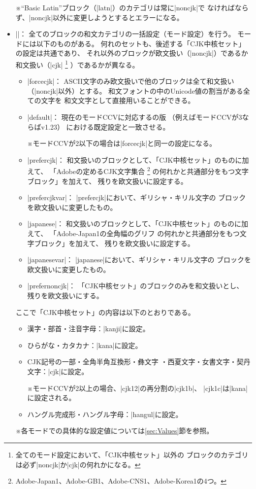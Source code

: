 \documentclass[uplatex,dvipdfmx,a4paper]{jsarticle}
\newcommand{\Meta}[1]{$\langle$\mbox{}#1\mbox{}$\rangle$}
\newcommand{\Note}{\par\noindent ※}
\newcommand{\Means}{：\quad}
\newcommand{\strong}{\textsf}
\begin{document}
\begin{itemize}
  \Note “Basic Latin”ブロック（|latn|）のカテゴリは常に|noncjk|で
    なければならず、|noncjk|以外に変更しようとするとエラーになる。

\item |\cjkcategorymode{|\Meta{モード}|}|\Means
  全てのブロックの和文カテゴリの一括設定（モード設定）を行う。
  モードには以下のものがある。
  何れのセットも、後述する「CJK中核セット」の設定は共通であり、
  それ以外のブロックが欧文扱い（|noncjk|）であるか
  和文扱い（|cjk|%
  \footnote{全てのモード設定において、「CJK中核セット」\strong{以外}の
    ブロックのカテゴリは必ず|noncjk|か|cjk|の何れかになる。}%
  ）であるかが異なる。
  \begin{itemize}
  \item |forcecjk|\Means
    ASCII文字のみ欧文扱いで他のブロックは全て和文扱い
    （|noncjk|以外）とする。
    和文フォントの中のUnicode値の割当がある全ての文字を
    和文文字として直接用いることができる。
  \item |default|\Means
    現在のモードCCVに対応する{\upTeX}の版
    （例えばモードCCVが3ならばv1.23）
    における既定設定と一致させる。
    \Note モードCCVが2以下の場合は|forcecjk|と同一の設定になる。
  \item |prefercjk|\Means
    和文扱いのブロックとして、「CJK中核セット」のものに加えて、
    「Adobeの定めるCJK文字集合
    \footnote{Adobe-Japan1、Adobe-GB1、Adobe-CNS1、Adobe-Korea1の4つ。}%
    の何れかと共通部分をもつ文字ブロック」を加えて、
    残りを欧文扱いに設定する。
  \item |prefercjkvar|\Means
    |prefercjk|において、ギリシャ・キリル文字の
    ブロックを欧文扱いに変更したもの。
  \item |japanese|\Means
    和文扱いのブロックとして、「CJK中核セット」のものに加えて、
    「Adobe-Japan1の全角幅のグリフ
    の何れかと共通部分をもつ文字ブロック」を加えて、
    残りを欧文扱いに設定する。
  \item |japanesevar|\Means
    |japanese|において、ギリシャ・キリル文字の
    ブロックを欧文扱いに変更したもの。
  \item |prefernoncjk|\Means
    「CJK中核セット」のブロックのみを和文扱いとし、
    残りを欧文扱いにする。
  \end{itemize}

  ここで「CJK中核セット」の内容は以下のとおりである。
    \begin{itemize}
    \item 漢字・部首・注音字母\Means |kanji|に設定。
    \item ひらがな・カタカナ\Means |kana|に設定。
    \item CJK記号の一部・全角半角互換形・彝文字
      ・西夏文字・女書文字・契丹文字\Means |cjk|に設定。
      \Note モードCCVが2以上の場合、|cjk12|の再分割の|cjk1b|、
        |cjk1c|は|kana|に設定される。
    \item ハングル完成形・ハングル字母\Means |hangul|に設定。
  \end{itemize}
  \Note 各モードでの具体的な設定値については\ref{sec:Values}節を参照。

\end{itemize}
\end{document}
